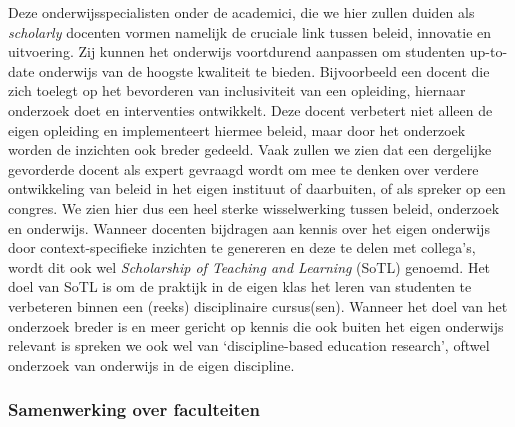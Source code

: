 \documentclass[smallauthor, chapterhaspagenum, nochapterinheader, pagenuminheader,  bigchapnum,medium2, tocpages, garamond, titleinheader]{jote-book}
\begin{document}
	Deze onderwijsspecialisten onder de academici, die we hier zullen duiden als \emph{scholarly} docenten vormen namelijk de cruciale link tussen beleid, innovatie en uitvoering. Zij kunnen het onderwijs voortdurend aanpassen om studenten up-to-date onderwijs van de hoogste kwaliteit te bieden. Bijvoorbeeld een docent die zich toelegt op het bevorderen van inclusiviteit van een opleiding, hiernaar onderzoek doet en interventies ontwikkelt. Deze docent verbetert niet alleen de eigen opleiding en implementeert hiermee beleid, maar door het onderzoek worden de inzichten ook breder gedeeld. Vaak zullen we zien dat een dergelijke gevorderde docent als expert gevraagd wordt om mee te denken over verdere ontwikkeling van beleid in het eigen instituut of daarbuiten, of als spreker op een congres. We zien hier dus een heel sterke wisselwerking tussen beleid, onderzoek en onderwijs. Wanneer docenten bijdragen aan kennis over het eigen onderwijs door context-specifieke inzichten te genereren en deze te delen met collega's, wordt dit ook wel \emph{Scholarship of Teaching and Learning} (SoTL) genoemd. Het doel van SoTL is om de praktijk in de eigen klas het leren van studenten te verbeteren binnen een (reeks) disciplinaire cursus(sen). Wanneer het doel van het onderzoek breder is en meer gericht op kennis die ook buiten het eigen onderwijs relevant is spreken we ook wel van ‘discipline-based education research', oftwel onderzoek van onderwijs in de eigen discipline.



	\subsubsection{Samenwerking over faculteiten}
\end{document}
